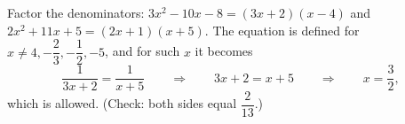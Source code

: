 Factor the denominators: $3x^2-10x-8=(3x+2)(x-4)$ and $2x^2+11x+5=(2x+1)(x+5)$. The equation is defined for $x\ne4,-\dfrac23,-\dfrac12,-5$, and for such $x$ it becomes
\[\dfrac{1}{3x+2}=\dfrac{1}{x+5}\qquad\Longrightarrow\qquad3x+2=x+5\qquad\Longrightarrow\qquad x=\boxed{\dfrac32},\]
which is allowed. (Check: both sides equal $\dfrac{2}{13}$.)
